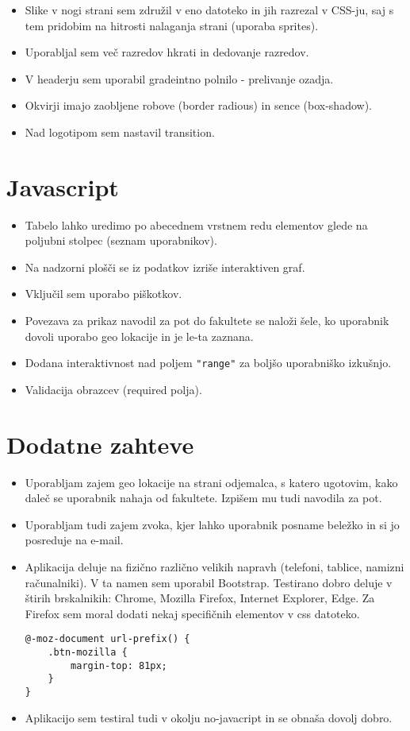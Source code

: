 \documentclass[a4paper,11pt]{article}
\begin{document}
\begin{itemize}
\item Slike v nogi strani sem združil v eno datoteko in jih razrezal v CSS-ju, saj s tem pridobim na hitrosti nalaganja strani (uporaba sprites).
\item Uporabljal sem več razredov hkrati in dedovanje razredov.
\item V headerju sem uporabil gradeintno polnilo - prelivanje ozadja.
\item Okvirji imajo zaobljene robove (border radious) in sence (box-shadow).
\item Nad logotipom sem nastavil transition.
\end{itemize}

\section{Javascript}

\begin{itemize}
\item Tabelo lahko uredimo po abecednem vrstnem redu elementov glede na poljubni stolpec (seznam uporabnikov).
\item Na nadzorni plošči se iz podatkov izriše interaktiven graf.
\item Vključil sem uporabo piškotkov.
\item Povezava za prikaz navodil za pot do fakultete se naloži šele, ko uporabnik dovoli uporabo geo lokacije in je le-ta zaznana.
\item Dodana interaktivnost nad poljem \texttt{"range"} za boljšo uporabniško izkušnjo.
\item Validacija obrazcev (required polja).
\end{itemize}

\section{Dodatne zahteve}

\begin{itemize}
\item Uporabljam zajem geo lokacije na strani odjemalca, s katero ugotovim, kako daleč se uporabnik nahaja od fakultete. Izpišem mu tudi navodila za pot.
\item Uporabljam tudi zajem zvoka, kjer lahko uporabnik posname beležko in si jo posreduje na e-mail.
\item Aplikacija deluje na fizično različno velikih napravh (telefoni, tablice, namizni računalniki). V ta namen sem uporabil Bootstrap. Testirano dobro deluje v štirih brskalnikih: Chrome, Mozilla Firefox, Internet Explorer, Edge. Za Firefox sem moral dodati nekaj specifičnih elementov v css datoteko.
\begin{lstlisting}
@-moz-document url-prefix() {
    .btn-mozilla {
        margin-top: 81px;
    }
}
\end{lstlisting}
\item Aplikacijo sem testiral tudi v okolju no-javacript in se obnaša dovolj dobro.
\end{itemize}
\end{document}
